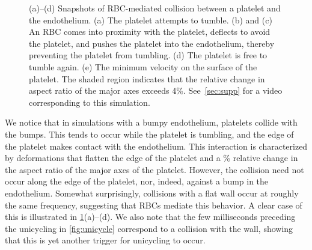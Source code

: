 \begin{figure}[tbp]
    \vspace{11pt}

    \begin{subfigure}[t]{\textwidth}
    \end{subfigure}
    \caption[RBC-mediated platelet-endothelial collision]{%
(a)--(d) Snapshots of RBC-mediated collision between a platelet and the endothelium. (a) The platelet attempts to
tumble. (b) and (c) An RBC comes into proximity with the platelet, deflects to avoid the platelet, and pushes the
platelet into the endothelium, thereby preventing the platelet from tumbling. (d) The platelet is free to tumble
again.  (e) The minimum velocity on the surface of the platelet. The shaded region indicates that the relative
change in aspect ratio of the major axes exceeds 4\%. See~\ref{sec:supp} for a video corresponding to this
simulation.
    }\label{fig:rbc-plt-endo-collision}
\end{figure}

We notice that in simulations with a bumpy endothelium, platelets collide with the bumps. This tends to occur
while the platelet is tumbling, and the edge of the platelet makes contact with the endothelium. This interaction
is characterized by deformations that flatten the edge of the platelet and a \% relative change in the
aspect ratio of the major axes of the platelet. However, the collision need not occur along the edge of the
platelet, nor, indeed, against a bump in the endothelium. Somewhat surprisingly, collisions with a flat wall occur
at roughly the same frequency, suggesting that RBCs mediate this behavior. A clear case of this is illustrated in
\cref{fig:rbc-plt-endo-collision}(a)--(d). We also note that the few milliseconds preceding the unicycling in
\cref{fig:unicycle} correspond to a collision with the wall, showing that this is yet another trigger for
unicycling to occur.

